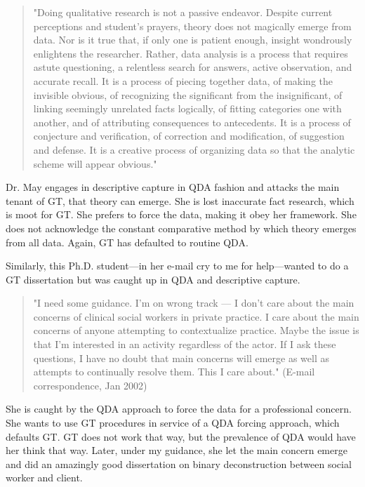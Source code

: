 \begin{quote}
"Doing qualitative research is not a passive endeavor. Despite current
perceptions and student’s prayers, theory does not magically emerge
from data. Nor is it true that, if only one is patient enough, insight
wondrously enlightens the researcher. Rather, data analysis is a
process that requires astute questioning, a relentless search for
answers, active observation, and accurate recall. It is a process of
piecing together data, of making the invisible obvious, of recognizing the
significant from the insignificant, of linking seemingly unrelated facts
logically, of fitting categories one with another, and of attributing
consequences to antecedents. It is a process of conjecture and
verification, of correction and modification, of suggestion and defense. It
is a creative process of organizing data so that the analytic scheme will
appear obvious." 
\citep[p. 10]{incollection.may94}
\end{quote}

Dr. May engages in descriptive capture in QDA fashion and attacks the main tenant of GT, that theory can emerge. 
She is lost inaccurate fact research, which is moot for GT.
She prefers to force the data, making it obey her framework. 
She does not acknowledge the constant comparative method by which theory emerges from all data. 
Again, GT has defaulted to routine QDA.

Similarly, this Ph.D. student—in her e-mail cry to me for help—wanted to do a
GT dissertation but was caught up in QDA and descriptive capture.

\begin{quote}
"I need some guidance. 
I’m on wrong track --- I don't care about the main concerns of clinical social workers in private practice. 
I care about the main concerns of anyone attempting to contextualize practice. 
Maybe the issue is that I'm interested in an activity regardless of the actor. 
If I ask these questions, I have no doubt that main concerns will emerge as well as attempts to continually resolve them. 
This I care about."
(E-mail correspondence, Jan 2002)
\end{quote}

She is caught by the QDA approach to force the data for a professional concern.
She wants to use GT procedures in service of a QDA forcing approach, which defaults GT. 
GT does not work that way, but the prevalence of QDA would have her think that way. 
Later, under my guidance, she let the main concern emerge and did an amazingly good dissertation on binary deconstruction between social worker and client.


